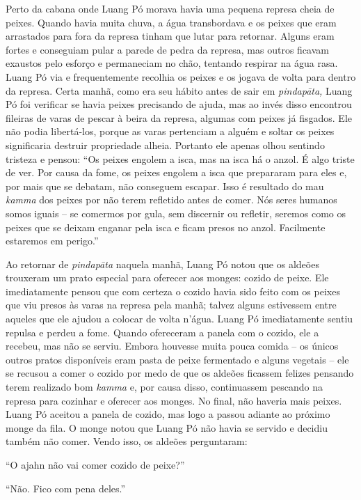 Perto da cabana onde Luang Pó morava havia uma pequena represa cheia de
peixes. Quando havia muita chuva, a água transbordava e os peixes que
eram arrastados para fora da represa tinham que lutar para retornar.
Alguns eram fortes e conseguiam pular a parede de pedra da represa, mas
outros ficavam exaustos pelo esforço e permaneciam no chão, tentando
respirar na água rasa. Luang Pó via e frequentemente recolhia os peixes
e os jogava de volta para dentro da represa. Certa manhã, como era seu
hábito antes de sair em \emph{pindapāta,} Luang Pó foi verificar se
havia peixes precisando de ajuda, mas ao invés disso encontrou fileiras
de varas de pescar à beira da represa, algumas com peixes já fisgados.
Ele não podia libertá-los, porque as varas pertenciam a alguém e soltar
os peixes significaria destruir propriedade alheia. Portanto ele apenas
olhou sentindo tristeza e pensou: ``Os peixes engolem a isca, mas na
isca há o anzol. É algo triste de ver. Por causa da fome, os peixes
engolem a isca que prepararam para eles e, por mais que se debatam, não
conseguem escapar. Isso é resultado do mau \emph{kamma} dos peixes por
não terem refletido antes de comer. Nós seres humanos somos iguais -- se
comermos por gula, sem discernir ou refletir, seremos como os peixes que
se deixam enganar pela isca e ficam presos no anzol. Facilmente
estaremos em perigo.''

Ao retornar de \emph{pindapāta} naquela manhã, Luang Pó notou que os
aldeões trouxeram um prato especial para oferecer aos monges: cozido de
peixe. Ele imediatamente pensou que com certeza o cozido havia sido
feito com os peixes que viu presos às varas na represa pela manhã;
talvez alguns estivessem entre aqueles que ele ajudou a colocar de volta
n'água. Luang Pó imediatamente sentiu repulsa e perdeu a fome. Quando
ofereceram a panela com o cozido, ele a recebeu, mas não se serviu.
Embora houvesse muita pouca comida -- os únicos outros pratos
disponíveis eram pasta de peixe fermentado e alguns vegetais -- ele se
recusou a comer o cozido por medo de que os aldeões ficassem felizes
pensando terem realizado bom \emph{kamma} e, por causa disso,
continuassem pescando na represa para cozinhar e oferecer aos monges. No
final, não haveria mais peixes. Luang Pó aceitou a panela de cozido, mas
logo a passou adiante ao próximo monge da fila. O monge notou que Luang
Pó não havia se servido e decidiu também não comer. Vendo isso, os
aldeões perguntaram:

``O ajahn não vai comer cozido de peixe?''

``Não. Fico com pena deles.''

